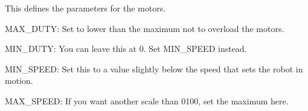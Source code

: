 \documentclass[letterpaper,10pt,english]{sphinxmanual}
\begin{document}
\begin{fulllineitems}
\label{\detokenize{autoapi/robotlibrary/config/index:robotlibrary.config.JS_MIN_DUTY}}
\pysigstartsignatures
{}
\pysigstopsignatures
\sphinxAtStartPar
This defines the parameters for the motors.

\sphinxAtStartPar
MAX\_DUTY: Set to lower than the maximum not to overload the motors.

\sphinxAtStartPar
MIN\_DUTY: You can leave this at 0. Set MIN\_SPEED instead.

\sphinxAtStartPar
MIN\_SPEED: Set this to a value slightly below the speed that sets the robot in motion.

\sphinxAtStartPar
MAX\_SPEED: If you want another scale than 0\sphinxhyphen{}100, set the maximum here.

\end{fulllineitems}


\begin{fulllineitems}
\label{\detokenize{autoapi/robotlibrary/config/index:robotlibrary.config.MAX_DUTY}}
\pysigstartsignatures
{}
\pysigstopsignatures
\end{fulllineitems}


\begin{fulllineitems}
\label{\detokenize{autoapi/robotlibrary/config/index:robotlibrary.config.MIN_DUTY}}
\pysigstartsignatures
{}
\pysigstopsignatures
\end{fulllineitems}


\begin{fulllineitems}
\label{\detokenize{autoapi/robotlibrary/config/index:robotlibrary.config.MIN_SPEED}}
\pysigstartsignatures
{}
\pysigstopsignatures
\end{fulllineitems}
\end{document}
